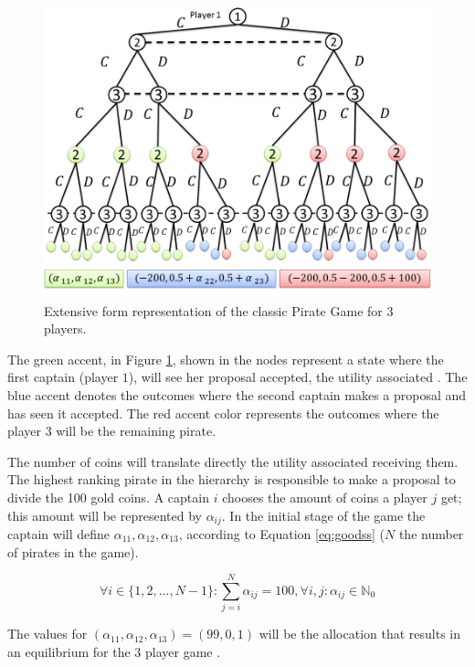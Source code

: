 \documentclass[10pt,twocolumn]{llncs}
\begin{document}
\begin{figure}[h]
\centering 
\includegraphics[scale=0.28]{Figures/1.5qubit/FigurasRevistas/Slide1.png}
\caption{Extensive form representation of the classic Pirate Game for $3$ players. }
\label{fig:pg_architecturegametree:extensiveform}
\end{figure}

The green accent, in Figure \ref{fig:pg_architecturegametree:extensiveform}, shown in the nodes represent a state where the first captain (player $1$), will see her proposal accepted, the utility associated . The blue accent denotes the outcomes where the second captain makes a proposal and has seen it accepted. The red accent color represents the outcomes where the player $3$ will be the remaining pirate.

The number of coins will translate directly the utility associated receiving them. The highest ranking pirate in the hierarchy is responsible to make a proposal to divide the 100 gold coins. A captain $i$ chooses the amount of coins a player $j$ get; this amount will be represented by $\alpha_{ij}$. In the initial stage of the game the captain will define $\alpha_{11}, \alpha_{12}, \alpha_{13}$, according to Equation \ref{eq:goodss} ($N$ the number of pirates in the game). 

\begin{equation}
\label{eq:goodss}
\forall i \in \{1 , 2, ..., N-1\} : \sum_{j=i}^{N}\alpha_{ij}=100, \forall i,j :\alpha_{ij}\in\mathbb{N}_{0}
\end{equation}

The values for $(\alpha_{11}, \alpha_{12}, \alpha_{13})=(99, 0, 1)$ will be the allocation that results in an equilibrium for the $3$ player game .
\end{document}
